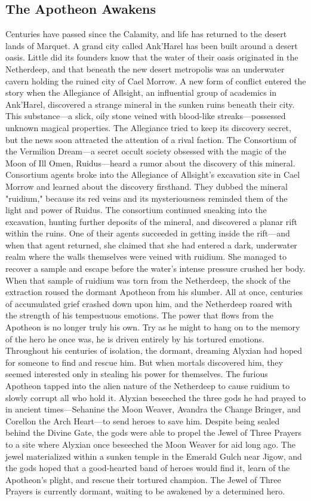 \documentclass[10pt,a4paper,twoside,bg=print,twocolumn,openany,nodeprecatedcode]{dndbook}
\begin{document}
\subsection{The Apotheon Awakens}
Centuries have passed since the Calamity, and life has returned to the desert lands of Marquet. A grand city called Ank'Harel has been built around a desert oasis. Little did its founders know that the water of their oasis originated in the Netherdeep, and that beneath the new desert metropolis was an underwater cavern holding the ruined city of Cael Morrow.
A new form of conflict entered the story when the Allegiance of Allsight, an influential group of academics in Ank'Harel, discovered a strange mineral in the sunken ruins beneath their city. This substance—a slick, oily stone veined with blood-like streaks—possessed unknown magical properties. The Allegiance tried to keep its discovery secret, but the news soon attracted the attention of a rival faction.
The Consortium of the Vermilion Dream—a secret occult society obsessed with the magic of the Moon of Ill Omen, Ruidus—heard a rumor about the discovery of this mineral. Consortium agents broke into the Allegiance of Allsight's excavation site in Cael Morrow and learned about the discovery firsthand. They dubbed the mineral "ruidium," because its red veins and its mysteriousness reminded them of the light and power of Ruidus.
The consortium continued sneaking into the excavation, hunting further deposits of the mineral, and discovered a planar rift within the ruins. One of their agents succeeded in getting inside the rift—and when that agent returned, she claimed that she had entered a dark, underwater realm where the walls themselves were veined with ruidium. She managed to recover a sample and escape before the water's intense pressure crushed her body.
When that sample of ruidium was torn from the Netherdeep, the shock of the extraction roused the dormant Apotheon from his slumber. All at once, centuries of accumulated grief crashed down upon him, and the Netherdeep roared with the strength of his tempestuous emotions.
The power that flows from the Apotheon is no longer truly his own. Try as he might to hang on to the memory of the hero he once was, he is driven entirely by his tortured emotions. Throughout his centuries of isolation, the dormant, dreaming Alyxian had hoped for someone to find and rescue him. But when mortals discovered him, they seemed interested only in stealing his power for themselves. The furious Apotheon tapped into the alien nature of the Netherdeep to cause ruidium to slowly corrupt all who hold it.
Alyxian beseeched the three gods he had prayed to in ancient times—Sehanine the Moon Weaver, Avandra the Change Bringer, and Corellon the Arch Heart—to send heroes to save him. Despite being sealed behind the Divine Gate, the gods were able to propel the Jewel of Three Prayers to a site where Alyxian once beseeched the Moon Weaver for aid long ago. The jewel materialized within a sunken temple in the Emerald Gulch near Jigow, and the gods hoped that a good-hearted band of heroes would find it, learn of the Apotheon's plight, and rescue their tortured champion. The Jewel of Three Prayers is currently dormant, waiting to be awakened by a determined hero.
\end{document}
